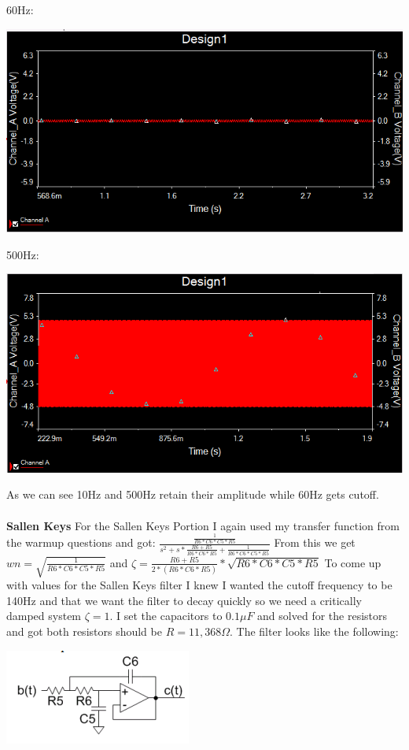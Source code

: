 \documentclass[12pt,letterpaper,boxed]{hmcpset}
\begin{document}
60Hz:
\begin{center}
\includegraphics[scale=1]{60Hzsim}
\end{center}
500Hz:
\begin{center}
\includegraphics[scale=1]{500Hz}
\end{center}
As we can see 10Hz and 500Hz retain their amplitude while 60Hz gets cutoff.\\\\
\textbf{Sallen Keys}
For the Sallen Keys Portion I again used my transfer function from the warmup questions and got: $\frac{\frac{1}{R6*C6*C5*R5}}{s^2 + s*\frac{R6+R5}{R6*C6*R5}+\frac{1}{R6*C6*C5*R5}}$ From this we get $wn=\sqrt{\frac{1}{R6*C6*C5*R5}}$ and $\zeta = \frac{R6+R5}{2*(R6*C6*R5)}*\sqrt{R6*C6*C5*R5}$ To come up with values for the Sallen Keys filter I knew I wanted the cutoff frequency to be 140Hz and that we want the filter to decay quickly so we need a critically damped system $\zeta =1$. I set the capacitors to $0.1\mu F$ and solved for the resistors and got both resistors should be $R=11,368\Omega$. The filter looks like the following:
\begin{center}
\includegraphics[scale=1]{Sallen}
\end{center}
\end{document}
